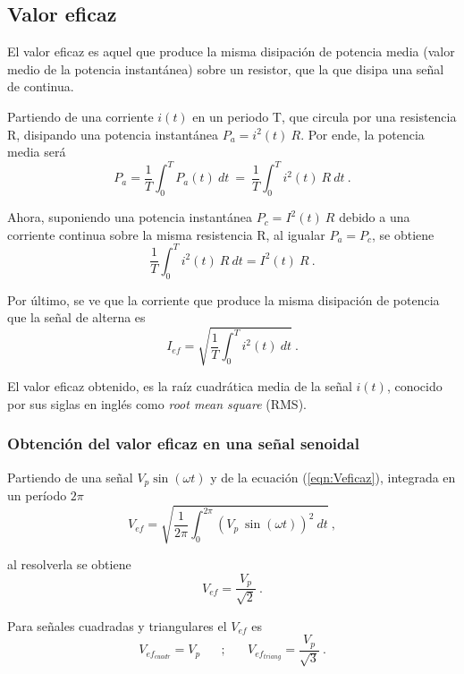 \subsection{Valor eficaz}

    El valor eficaz es aquel que produce la misma disipación de potencia 
    media (valor medio de la potencia instantánea) sobre un 
    resistor, que la que disipa una señal de continua.
    
    Partiendo de una corriente \(i(t)\) en un periodo T, que circula 
    por una resistencia R, disipando una potencia instantánea  \(P_a = i^2(t)~R\).
    Por ende, la potencia media será
    \begin{equation*}
        P_a = \dfrac{1}{T} \int_{0}^{T} P_a(t)~dt ~ = ~ 
        \dfrac{1}{T} \int_{0}^{T} i^2(t)~R~dt ~.
    \end{equation*}

    Ahora, suponiendo una potencia instantánea \(P_c = I^2(t)~R\) debido a una 
    corriente continua sobre la misma resistencia R,
    al igualar \(P_a = P_c\), se obtiene 
    \begin{equation*}
        \dfrac{1}{T} \int_{0}^{T} i^2(t)~R~dt = I^2(t)~R~.    
    \end{equation*}

    Por último, se ve que la corriente que produce la
    misma disipación de potencia que la señal de alterna es 
    \begin{equation}
        I_{ef} = \sqrt{\dfrac{1}{T} \int_{0}^{T} i^2(t)~dt}~. \label{eqn:Veficaz}
    \end{equation}

    \noindent El valor eficaz obtenido, es la raíz cuadrática media
    de la señal \(i(t)\), conocido por sus siglas en inglés como 
    \textit{root mean square} (RMS).

        \subsubsection{Obtención del valor eficaz en una señal senoidal}

            Partiendo de una señal \(V_p\sin(\omega t)\) y de la ecuación (\ref{eqn:Veficaz}), 
            integrada en un período \(2\pi\)
            \begin{equation*}
                V_{ef} = \sqrt{\dfrac{1}{2\pi} \int_{0}^{2\pi} (V_p~\sin(\omega t))^2~dt}~,        
            \end{equation*}

            \noindent al resolverla se obtiene     
            \begin{equation*}
                V_{ef} = \dfrac{V_p}{\sqrt{2}}~.    
            \end{equation*}    

            Para señales cuadradas y triangulares el \(V_{ef}\) es
            \begin{equation}
                V_{ef_{cuadr}}  =  V_p \hspace{20pt} ; \hspace{20pt}    \label{eqn:VeficazdeSeñales}
                V_{ef_{triang}} = \dfrac{V_p}{\sqrt{3}}~.
            \end{equation}